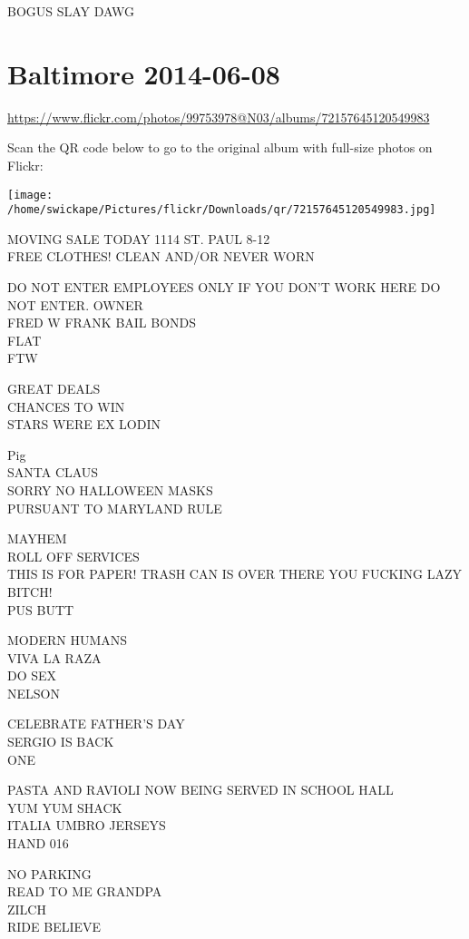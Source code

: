 \documentclass[10pt,letterpaper]{article}
\begin{document}
BOGUS SLAY DAWG


\section*{Baltimore 2014-06-08}

\url{https://www.flickr.com/photos/99753978@N03/albums/72157645120549983}

Scan the QR code below to go to the original album with full-size photos on Flickr:

\texttt{[image: /home/swickape/Pictures/flickr/Downloads/qr/72157645120549983.jpg]}


MOVING SALE TODAY 1114 ST. PAUL 8{-}12\\
FREE CLOTHES! CLEAN AND/OR NEVER WORN

DO NOT ENTER EMPLOYEES ONLY IF YOU DON'T WORK HERE DO NOT ENTER.  OWNER\\
FRED W FRANK BAIL BONDS\\
FLAT\\
FTW

GREAT DEALS\\
CHANCES TO WIN\\
STARS WERE EX LODIN

Pig\\
SANTA CLAUS\\
SORRY NO HALLOWEEN MASKS\\
PURSUANT TO MARYLAND RULE

MAYHEM\\
ROLL OFF SERVICES\\
THIS IS FOR PAPER!  TRASH CAN IS OVER THERE YOU FUCKING LAZY BITCH!\\
PUS BUTT

MODERN HUMANS\\
VIVA LA RAZA\\
DO SEX\\
NELSON

CELEBRATE FATHER'S DAY\\
SERGIO IS BACK\\
ONE

PASTA AND RAVIOLI NOW BEING SERVED IN SCHOOL HALL\\
YUM YUM SHACK\\
ITALIA UMBRO JERSEYS\\
HAND 016

NO PARKING\\
READ TO ME GRANDPA\\
ZILCH\\
RIDE BELIEVE
\end{document}

